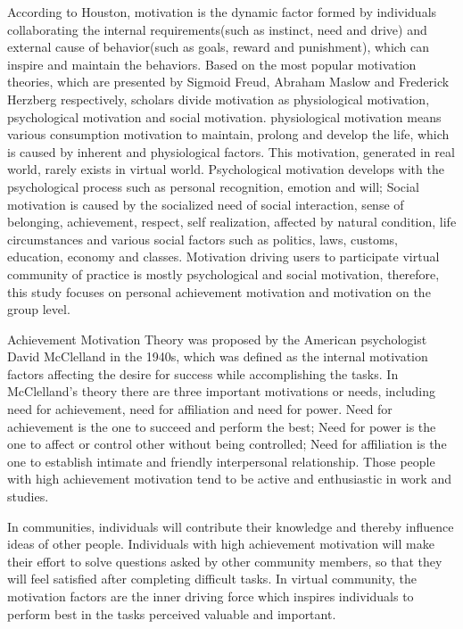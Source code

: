 \documentclass{elsarticle}
\begin{document}
According to Houston, motivation is the dynamic factor formed by
individuals collaborating the internal requirements(such as instinct,
need and drive) and external cause of behavior(such as goals, reward
and punishment), which can inspire and maintain the behaviors. Based
on the most popular motivation theories, which are presented by
Sigmoid Freud, Abraham Maslow and Frederick Herzberg respectively,
scholars divide motivation as physiological motivation, psychological
motivation and social motivation. physiological motivation means
various consumption motivation to maintain, prolong and develop the
life, which is caused by inherent and physiological factors. This
motivation, generated in real world, rarely exists in virtual
world. Psychological motivation develops with the psychological
process such as personal recognition, emotion and will; Social
motivation is caused by the socialized need of social interaction,
sense of belonging, achievement, respect, self realization, affected
by natural condition, life circumstances and various social factors
such as politics, laws, customs, education, economy and
classes. Motivation driving users to participate virtual community of
practice is mostly psychological and social motivation, therefore,
this study focuses on personal achievement motivation and motivation
on the group level. 

Achievement Motivation Theory was proposed by the American
psychologist David McClelland in the 1940s, which was defined as the
internal motivation factors affecting the desire for success while
accomplishing the tasks. In McClelland’s theory there are three
important motivations or needs, including need for achievement, need
for affiliation and need for power. Need for achievement is the one to
succeed and perform the best; Need for power is the one to affect or
control other without being controlled; Need for affiliation is the
one to establish intimate and friendly interpersonal
relationship. Those people with high achievement motivation tend to be
active and enthusiastic in work and studies. 

In communities, individuals will contribute their knowledge and
thereby influence ideas of other people. Individuals with high
achievement motivation will make their effort to solve questions asked
by other community members, so that they will feel satisfied after
completing difficult tasks. In virtual community, the motivation
factors are the inner driving force which inspires individuals to
perform best in the tasks perceived valuable and important.  
\end{document}
